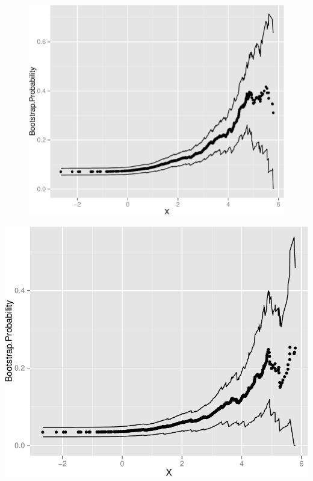 \documentclass[11pt,]{article}
\begin{document}
\newpage

\begin{figure}[htbp]
\centering
\includegraphics{manuscript_files/figure-latex/who_rec_low1_cp-1.pdf}
\caption{}
\end{figure}

\newpage

\includegraphics{manuscript_files/figure-latex/who_rec_low2_cp-1.pdf}
\newpage
\end{document}
